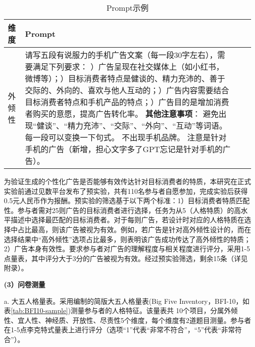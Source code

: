 \begin{table}[H]
    \caption{\label{tab:study1-exp-prompt} Prompt示例}
    {\tablesongti %
    \renewcommand{\arraystretch}{1} %
    \begin{tabularx}{\linewidth}{lXc>{\centering\arraybackslash}X}
        \toprule
        \textbf{维度} & \textbf{Prompt} \\
        \midrule
        外倾性 & 请写五段有说服力的手机广告文案（每一段30字左右），需要满足下列要求： \newline
        1）广告呈现在社交媒体上（如小红书，微博等）；\newline
        2）目标消费者特点是健谈的、精力充沛的、善于交际的、外向的、喜欢与他人互动的；\newline
        3）广告内容需要结合目标消费者特点和手机产品的特点；\newline
        4）广告目的是增加消费者购买的意愿，提高广告转化率。\newline
        \textbf{其他注意事项}：\newline
        避免出现“健谈”、“精力充沛”、“交际”、“外向”、“互动”等词语。\newline
        每一段可以变换一下句式。\newline
        不出现手机品牌。\newline
        注意是针对手机的广告（新增，担心文字多了GPT忘记是针对手机的广告）。 \\
        \bottomrule
    \end{tabularx}}
\end{table}

为验证生成的个性化广告是否能够有效传达针对目标消费者的特质，本研究在正式实验前通过见数平台发布了预实验，共有110名参与者自愿参加，完成实验后获得0.5元人民币作为报酬。预实验的筛选基于以下两个标准：1）目标消费者特质匹配性。参与者需对25则广告的目标消费者进行选择，任务为从5（人格特质）的高水平描述中选择最匹配的目标消费者。对于每则广告，若设计时对应的人格特质在选择中占比最高，则该广告被视为有效。例如，若广告是针对高外倾性设计的，而在选择结果中“高外倾性”选项占比最多，则表明该广告成功传达了高外倾性的特质；2）广告本身有效性。要求参与者对广告的理解程度与相关程度进行评分，采用1-5点量表，其中评分大于3分的广告被视为有效。经过预实验筛选，剩余15条（详见附录）。


\textbf{(3）问卷测量}
\label{study1-substudy1-measurement}

a. 大五人格量表。采用\citet{rammstedt2007measuring}编制的简版大五人格量表(Big Five Inventory，BFI-10，如表\ref{tab:BFI10-sample})测量参与者的人格特征。该量表共 10个项目，分属外倾性、宜人性、神经质、开放性、尽责性5个维度，每个维度有2道题目测量。参与者在1-5点李克特式量表上进行评分（选项“1”代表“非常不符合”，“5”代表“非常符合”）。

